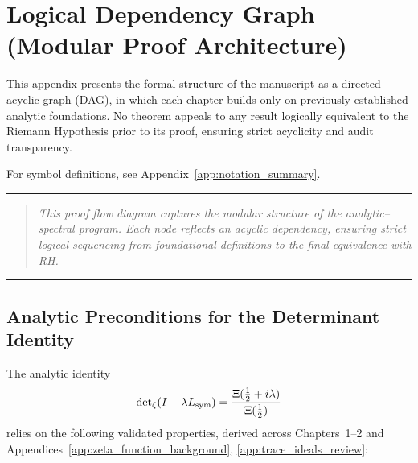 \section{Logical Dependency Graph (Modular Proof Architecture)}
\label{app:dependency_graph}

This appendix presents the formal structure of the manuscript as a directed acyclic graph (DAG), in which each chapter builds only on previously established analytic foundations. No theorem appeals to any result logically equivalent to the Riemann Hypothesis prior to its proof, ensuring strict acyclicity and audit transparency.

For symbol definitions, see Appendix~\ref{app:notation_summary}.

\vspace{1ex}
\hrule
\vspace{1ex}

\begin{quote}
\textit{This proof flow diagram captures the modular structure of the analytic–spectral program. Each node reflects an acyclic dependency, ensuring strict logical sequencing from foundational definitions to the final equivalence with RH.}
\end{quote}

\vspace{1ex}
\hrule
\vspace{2ex}

\subsection*{Analytic Preconditions for the Determinant Identity}
\label{dag:determinant_preconditions}

The analytic identity
\[
\det\nolimits_\zeta(I - \lambda L_{\mathrm{sym}}) = \frac{\Xi(\tfrac{1}{2} + i\lambda)}{\Xi(\tfrac{1}{2})}
\]
relies on the following validated properties, derived across Chapters~1–2 and Appendices~\ref{app:zeta_function_background}, \ref{app:trace_ideals_review}:

